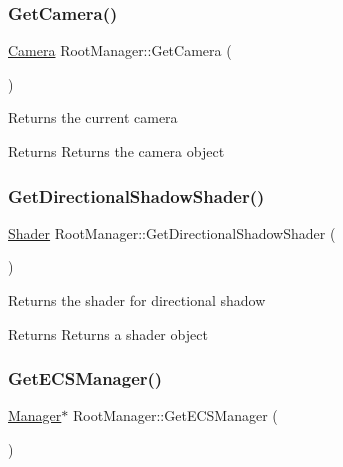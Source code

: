 \subsubsection{\texorpdfstring{GetCamera()}{GetCamera()}}
{\footnotesize\ttfamily \mbox{\hyperlink{class_camera}{Camera}} Root\+Manager\+::\+Get\+Camera (\begin{DoxyParamCaption}{ }\end{DoxyParamCaption})\hspace{0.3cm}{\ttfamily [inline]}}

Returns the current camera \begin{DoxyReturn}{Returns}
Returns the camera object 
\end{DoxyReturn}
\mbox{\label{class_root_manager_ad36825d276b3eb4e5499ff37c7673d9c}} 
\subsubsection{\texorpdfstring{GetDirectionalShadowShader()}{GetDirectionalShadowShader()}}
{\footnotesize\ttfamily \mbox{\hyperlink{class_shader}{Shader}} Root\+Manager\+::\+Get\+Directional\+Shadow\+Shader (\begin{DoxyParamCaption}{ }\end{DoxyParamCaption})\hspace{0.3cm}{\ttfamily [inline]}}

Returns the shader for directional shadow \begin{DoxyReturn}{Returns}
Returns a shader object 
\end{DoxyReturn}
\mbox{\label{class_root_manager_a7990956f6ad217de97f7574880f5865b}} 
\subsubsection{\texorpdfstring{GetECSManager()}{GetECSManager()}}
{\footnotesize\ttfamily \mbox{\hyperlink{class_manager}{Manager}}$\ast$ Root\+Manager\+::\+Get\+E\+C\+S\+Manager (\begin{DoxyParamCaption}{ }\end{DoxyParamCaption})\hspace{0.3cm}{\ttfamily [inline]}}

